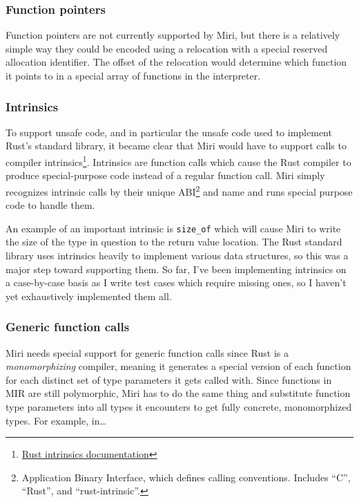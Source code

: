 \documentclass[twocolumn]{article}
\newcommand{\rust}[1]{\texttt{#1}}
\begin{document}
\subsubsection{Function pointers}

Function pointers are not currently supported by Miri, but there is a relatively simple way they
could be encoded using a relocation with a special reserved allocation identifier. The offset of the
relocation would determine which function it points to in a special array of functions in the
interpreter.

\subsubsection{Intrinsics}

To support unsafe code, and in particular the unsafe code used to implement Rust's standard library,
it became clear that Miri would have to support calls to compiler
intrinsics\footnote{\href{https://doc.rust-lang.org/stable/std/intrinsics/index.html}{Rust
intrinsics documentation}}. Intrinsics are function calls which cause the Rust compiler to produce
special-purpose code instead of a regular function call. Miri simply recognizes intrinsic calls by
their unique ABI\footnote{Application Binary Interface, which defines calling conventions. Includes
``C'', ``Rust'', and ``rust-intrinsic''.} and name and runs special purpose code to handle them.

An example of an important intrinsic is \rust{size_of} which will cause Miri to write the size of
the type in question to the return value location. The Rust standard library uses intrinsics heavily
to implement various data structures, so this was a major step toward supporting them. So far, I've
been implementing intrinsics on a case-by-case basis as I write test cases which require missing
ones, so I haven't yet exhaustively implemented them all.

\subsubsection{Generic function calls}

Miri needs special support for generic function calls since Rust is a \emph{monomorphizing}
compiler, meaning it generates a special version of each function for each distinct set of type
parameters it gets called with. Since functions in MIR are still polymorphic, Miri has to do the
same thing and substitute function type parameters into all types it encounters to get fully
concrete, monomorphized types. For example, in\ldots
\end{document}
